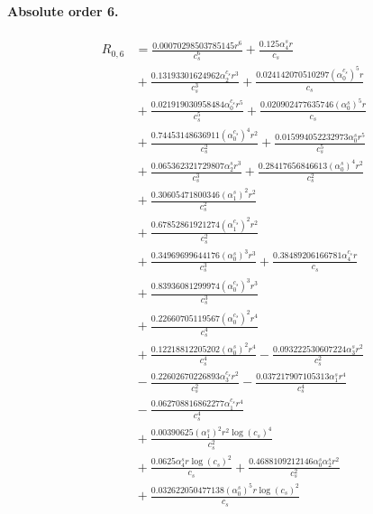 \documentclass[10pt]{article}
\begin{document}
\paragraph{Absolute order 6.}
\begin{align*}
R_{0,6} &= \frac{0.00070298503785145 r^{6}}{c_{s}^{6}} + \frac{0.125 \alpha_{4}^s r}{c_{s}} \\
&{}  + \frac{0.13193301624962 \alpha_{2}^{c_s} r^{3}}{c_{s}^{3}} + \frac{0.024142070510297 \left(\alpha_{0}^{c_s}\right)^{5} r}{c_{s}} \\
&{}  + \frac{0.021919030958484 \alpha_{0}^{c_s} r^{5}}{c_{s}^{5}} + \frac{0.020902477635746 \left(\alpha_{0}^s\right)^{5} r}{c_{s}} \\
&{}  + \frac{0.74453148636911 \left(\alpha_{0}^{c_s}\right)^{4} r^{2}}{c_{s}^{2}} + \frac{0.015994052232973 \alpha_{0}^s r^{5}}{c_{s}^{5}} \\
&{}  + \frac{0.065362321729807 \alpha_{2}^s r^{3}}{c_{s}^{3}} + \frac{0.28417656846613 \left(\alpha_{0}^s\right)^{4} r^{2}}{c_{s}^{2}} \\
&{}  + \frac{0.30605471800346 \left(\alpha_{1}^s\right)^{2} r^{2}}{c_{s}^{2}} \\
&{}  + \frac{0.67852861921274 \left(\alpha_{1}^{c_s}\right)^{2} r^{2}}{c_{s}^{2}} \\
&{}  + \frac{0.34969699644176 \left(\alpha_{0}^s\right)^{3} r^{3}}{c_{s}^{3}} + \frac{0.38489206166781 \alpha_{4}^{c_s} r}{c_{s}} \\
&{}  + \frac{0.83936081299974 \left(\alpha_{0}^{c_s}\right)^{3} r^{3}}{c_{s}^{3}} \\
&{}  + \frac{0.22660705119567 \left(\alpha_{0}^{c_s}\right)^{2} r^{4}}{c_{s}^{4}} \\
&{}  + \frac{0.12218812205202 \left(\alpha_{0}^s\right)^{2} r^{4}}{c_{s}^{4}} - \frac{0.093222530607224 \alpha_{3}^s r^{2}}{c_{s}^{2}} \\
&{}  - \frac{0.22602670226893 \alpha_{3}^{c_s} r^{2}}{c_{s}^{2}} - \frac{0.037217907105313 \alpha_{1}^s r^{4}}{c_{s}^{4}} \\
&{}  - \frac{0.062708816862277 \alpha_{1}^{c_s} r^{4}}{c_{s}^{4}} \\
&{}  + \frac{0.00390625 \left(\alpha_{1}^s\right)^{2} r^{2} \log{\left(c_{s} \right)}^{4}}{c_{s}^{2}} \\
&{}  + \frac{0.0625 \alpha_{4}^s r \log{\left(c_{s} \right)}^{2}}{c_{s}} + \frac{0.4688109212146 \alpha_{0}^s \alpha_{2}^s r^{2}}{c_{s}^{2}} \\
&{}  + \frac{0.032622050477138 \left(\alpha_{0}^s\right)^{5} r \log{\left(c_{s} \right)}^{2}}{c_{s}} \\

\end{align*}
\end{document}
